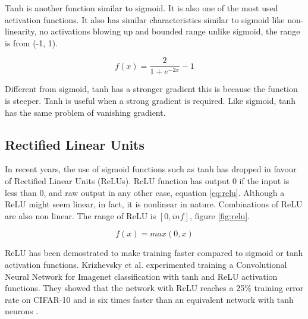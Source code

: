 Tanh is another function similar to sigmoid. It is also one of the most used activation functions. It also has similar characteristics similar to sigmoid like non-linearity, no activations blowing up and bounded range unlike sigmoid, the range is from (-1, 1).

\begin{equation} \label{eq:tanh}
	f(x)=\frac{\mathrm{2} }{\mathrm{1} + e^{-2x} }-1
\end{equation}

Different from sigmoid, tanh has a stronger gradient this is because the function is steeper. Tanh is useful when a strong gradient is required. Like sigmoid, tanh has the same problem of vanishing gradient. \cite{SharmaVUnderstandingNetworks}



\subsection{Rectified Linear Units}

In recent years, the use of sigmoid functions such as tanh has dropped in favour of Rectified Linear Units (ReLUs). ReLU function has output 0 if the input is less than 0, and raw output in any other case, equation \ref{eq:relu}. Although a ReLU might seem linear, in fact, it is nonlinear in nature. Combinations of ReLU are also non linear. The range of ReLU is $[0, inf]$, figure \ref{fig:relu}.

\begin{equation} \label{eq:relu}
	f(x)=max(0,x)
\end{equation}

ReLU has been demostrated to make training faster compared to sigmoid or tanh activation functions. Krizhevsky et al. experimented training a Convolutional Neural Network for Imagenet classification with tanh and ReLU activation functions. They showed that the network with ReLU reaches a 25\% training error rate on CIFAR-10 and is six times faster than an equivalent network with tanh neurons \cite{KrizhevskyImageNetNetworks}.

